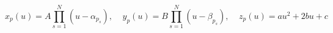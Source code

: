 \begin{equation}
x_p(u)=A\prod\limits_{s=1}^N(u-\alpha_{p_s}),\:\:\:\:\:
y_p(u)=B\prod\limits_{s=1}^N(u-\beta_{p_s}),\:\:\:\:\:z_p(u)=au^2+2bu+c
\label{EHszeles}
\end{equation}

